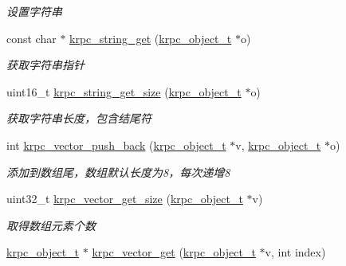 \begin{DoxyCompactItemize}
\begin{DoxyCompactList}\small\item\em 设置字符串 \end{DoxyCompactList}\item 
const char $\ast$ \hyperlink{a00119_ga4cbbacb71688aa9ee2c5811076132bce_ga4cbbacb71688aa9ee2c5811076132bce}{krpc\+\_\+string\+\_\+get} (\hyperlink{a00056_a9c07dfc8c3b965f75b09f82fdb1bbb1e_a9c07dfc8c3b965f75b09f82fdb1bbb1e}{krpc\+\_\+object\+\_\+t} $\ast$o)
\begin{DoxyCompactList}\small\item\em 获取字符串指针 \end{DoxyCompactList}\item 
uint16\+\_\+t \hyperlink{a00119_ga1de7973df219a3f8d3f466d27ba8c080_ga1de7973df219a3f8d3f466d27ba8c080}{krpc\+\_\+string\+\_\+get\+\_\+size} (\hyperlink{a00056_a9c07dfc8c3b965f75b09f82fdb1bbb1e_a9c07dfc8c3b965f75b09f82fdb1bbb1e}{krpc\+\_\+object\+\_\+t} $\ast$o)
\begin{DoxyCompactList}\small\item\em 获取字符串长度，包含结尾符 \end{DoxyCompactList}\item 
int \hyperlink{a00119_gac870fa910b5e155c9f566ead4fac2b54_gac870fa910b5e155c9f566ead4fac2b54}{krpc\+\_\+vector\+\_\+push\+\_\+back} (\hyperlink{a00056_a9c07dfc8c3b965f75b09f82fdb1bbb1e_a9c07dfc8c3b965f75b09f82fdb1bbb1e}{krpc\+\_\+object\+\_\+t} $\ast$v, \hyperlink{a00056_a9c07dfc8c3b965f75b09f82fdb1bbb1e_a9c07dfc8c3b965f75b09f82fdb1bbb1e}{krpc\+\_\+object\+\_\+t} $\ast$o)
\begin{DoxyCompactList}\small\item\em 添加到数组尾，数组默认长度为8，每次递增8 \end{DoxyCompactList}\item 
uint32\+\_\+t \hyperlink{a00119_gac86bb807e52193aaa69ce6fe36cd59c8_gac86bb807e52193aaa69ce6fe36cd59c8}{krpc\+\_\+vector\+\_\+get\+\_\+size} (\hyperlink{a00056_a9c07dfc8c3b965f75b09f82fdb1bbb1e_a9c07dfc8c3b965f75b09f82fdb1bbb1e}{krpc\+\_\+object\+\_\+t} $\ast$v)
\begin{DoxyCompactList}\small\item\em 取得数组元素个数 \end{DoxyCompactList}\item 
\hyperlink{a00056_a9c07dfc8c3b965f75b09f82fdb1bbb1e_a9c07dfc8c3b965f75b09f82fdb1bbb1e}{krpc\+\_\+object\+\_\+t} $\ast$ \hyperlink{a00119_ga0291a0548378269354fc614712f4c31e_ga0291a0548378269354fc614712f4c31e}{krpc\+\_\+vector\+\_\+get} (\hyperlink{a00056_a9c07dfc8c3b965f75b09f82fdb1bbb1e_a9c07dfc8c3b965f75b09f82fdb1bbb1e}{krpc\+\_\+object\+\_\+t} $\ast$v, int index)

\end{DoxyCompactItemize}
